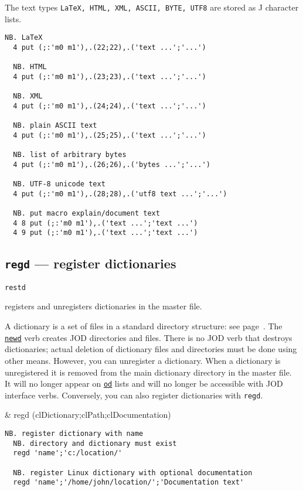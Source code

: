 The text types \texttt{LaTeX, HTML, XML, ASCII,  BYTE, UTF8}
are stored as J character lists. 

\begin{lstlisting}[frame=single,framerule=0pt]   
  NB. LaTeX 
  4 put (;:'m0 m1'),.(22;22),.('text ...';'...') 
  
  NB. HTML 
  4 put (;:'m0 m1'),.(23;23),.('text ...';'...') 

  NB. XML 
  4 put (;:'m0 m1'),.(24;24),.('text ...';'...') 
  
  NB. plain ASCII text 
  4 put (;:'m0 m1'),.(25;25),.('text ...';'...') 
  
  NB. list of arbitrary bytes
  4 put (;:'m0 m1'),.(26;26),.('bytes ...';'...') 
  
  NB. UTF-8 unicode text 
  4 put (;:'m0 m1'),.(28;28),.('utf8 text ...';'...') 

  NB. put macro explain/document text
  4 8 put (;:'m0 m1'),.('text ...';'text ...')
  4 9 put (;:'m0 m1'),.('text ...';'text ...') 
\end{lstlisting}                  


\subsection{\texttt{regd} --- register dictionaries}\label{ss:regd}

\hypertarget{il:restd}{\texttt{restd}} registers and unregisters 
 dictionaries in the master file.
 
 A dictionary is a set of files in a standard directory structure: see page~\pageref{ss:joddirs}. 
 The \hyperlink{il:newd}{\texttt{newd}} verb creates JOD directories and files.
  There is no JOD verb that destroys dictionaries; actual 
  deletion of dictionary files and directories must be done using 
  other means. However, you can unregister a dictionary. 
  When a dictionary is unregistered it is removed from the main 
  dictionary directory in the master file. It will no longer appear 
  on \hyperlink{il:od}{\texttt{od}} lists and will no longer be accessible with JOD interface verbs. 
  Conversely, you can also register dictionaries with \texttt{regd}. 

\begin{wordhead}
\monad & regd (clDictionary;clPath;clDocumentation) \\
\end{wordhead}
\begin{lstlisting}[frame=single,framerule=0pt] 
  NB. register dictionary with name 
  NB. directory and dictionary must exist
  regd 'name';'c:/location/' 

  NB. register Linux dictionary with optional documentation
  regd 'name';'/home/john/location/';'Documentation text' 
\end{lstlisting} 

